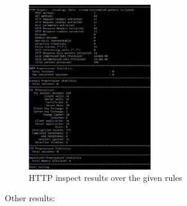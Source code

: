 \documentclass{article}
\begin{document}
\begin{figure}[H]
	\begin{center}
		\includegraphics[width=0.48\textwidth]{Res1.jpg}
	\end{center}
	\caption{HTTP inspect results over the given rules}
	\label{fig:Res1}
\end{figure}

Other results:
\end{document}
